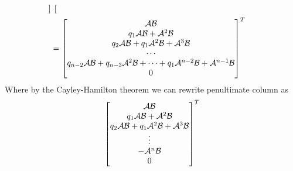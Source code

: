 \begin{appendices}
\begin{equation*}
\begin{split}
\begin{bmatrix}
        \end{bmatrix} \\
        &= 
        \begin{bmatrix}
            \mathcal{A}\mathcal{B} \\ q_1\mathcal{A}\mathcal{B} + \mathcal{A}^2\mathcal{B} \\ q_2\mathcal{A}\mathcal{B} + q_1\mathcal{A}^2\mathcal{B} + \mathcal{A}^3\mathcal{B} \\ \cdots \\ q_{n-2}\mathcal{A}\mathcal{B} + q_{n-3}\mathcal{A}^2\mathcal{B} + \cdots + q_1\mathcal{A}^{n-2}\mathcal{B} + \mathcal{A}^{n-1}\mathcal{B} \\ 0 \\      
        \end{bmatrix}^T
    \end{split}
\end{equation*}
Where by the Cayley-Hamilton theorem we can rewrite penultimate column as
\begin{equation*}
    \begin{bmatrix}
            \mathcal{A}\mathcal{B} \\ q_1\mathcal{A}\mathcal{B} + \mathcal{A}^2\mathcal{B} \\ q_2\mathcal{A}\mathcal{B} + q_1\mathcal{A}^2\mathcal{B} + \mathcal{A}^3\mathcal{B} \\ \vdots \\ -\mathcal{A}^n\mathcal{B} \\ 0 \\      
        \end{bmatrix}^T
\end{equation*}


\end{appendices}
